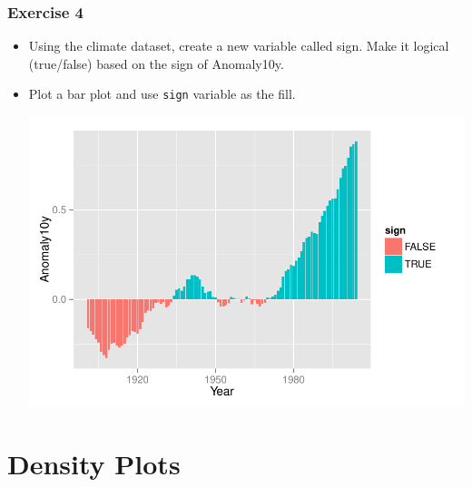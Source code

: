 \documentclass{beamer}\usepackage[]{graphicx}\usepackage[]{color}
\newenvironment{knitrout}{}{} %
\begin{document}

\begin{frame}[fragile]
\frametitle{Exercise 4}
\begin{itemize}
\item Using the climate dataset, create a new variable called sign. Make it logical (true/false) based on the sign of Anomaly10y.
\item Plot a bar plot and use \texttt{sign} variable as the fill.\\
\begin{knitrout}\footnotesize
{}\color{fgcolor}

{\centering \includegraphics[width=.75\linewidth]{figure/ex4} 

}



\end{knitrout}

\end{itemize}
\end{frame}


\section*{Density Plots}
\frame{\sectionpage}

\end{document}
